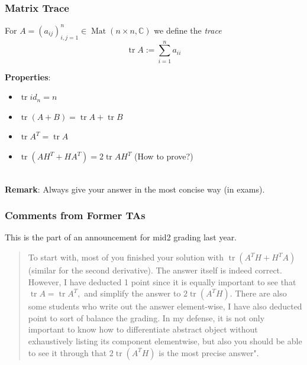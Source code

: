 \documentclass[12pt, t]{beamer}
\renewcommand{\emph}[1]{{\color{Turquoise3}\textsl{#1}}}
\newcommand{\nullspace}{~\\[15pt]}
\begin{document}
\begin{frame}
    \frametitle{Matrix Trace}
    For $A=\left(a_{i j}\right)_{i, j=1}^{n} \in \operatorname{Mat}(n \times n, \mathbb{C})$ we define the \emph{trace} $$\operatorname{tr} A:=\sum_{i=1}^{n} a_{i i}$$

    \textbf{Properties}:
    \begin{itemize}
        \item $\operatorname{tr} i d_n=n$
        \item $\operatorname{tr}(A+B)=\operatorname{tr} A+\operatorname{tr} B $
        \item $\operatorname{tr} A^{T}=\operatorname{tr} A    $
        \item $\operatorname{tr}\left(A H^{T}+H A^{T}\right)=2 \operatorname{tr} A H^{T}$ (How to prove?)
    \end{itemize}
    \nullspace
    \textbf{Remark}: Always give your answer in the most concise way (in exams).
\end{frame}

\begin{frame}
    \frametitle{Comments from Former TAs}
    This is the part of an announcement for mid2 grading last year.
    \nullspace
    \begin{quote}
        To start with, most of you finished your solution with $\operatorname{tr}\left(A^{T} H+H^{T} A\right)$ (similar for the second derivative). The answer itself is indeed correct. However, I have deducted 1 point since it is equally important to see that $\operatorname{tr} A=\operatorname{tr} A^{T},$ and simplify the answer to $2 \operatorname{tr}\left(A^{T} H\right) .$ There are also some students who write out the answer element-wise, I have also deducted point to sort of balance the grading. In my defense, it is not only important to know how to differentiate abstract object without exhaustively listing its component elementwise, but also you should be able to see it through that $2 \operatorname{tr}\left(A^{T} H\right)$ is the most precise answer".
    \end{quote}

\end{frame}
\end{document}
